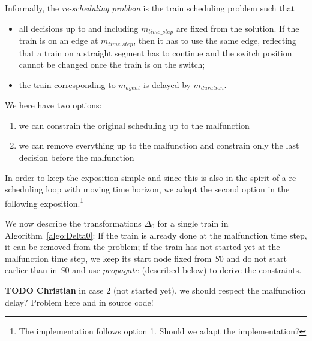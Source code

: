 \documentclass{article}
\begin{document}
Informally, the \emph{re-scheduling problem} is the train scheduling problem such that
\begin{itemize}
    \item all decisions up to and including $m_{time\_step}$ are fixed from the solution. If the train is on an edge at $m_{time\_step}$, then it has to use the same edge, reflecting that a train on a straight segment has to continue and the switch position cannot be changed once the train is on the switch;
    \item the train corresponding to $m_{agent}$ is delayed by $m_{duration}$.
\end{itemize}
We here have two options:
\begin{enumerate}
    \item we can constrain the original scheduling up to the malfunction
    \item we can remove everything up to the malfunction and constrain only the last decision before the malfunction
\end{enumerate}
In order to keep the exposition simple and since this is also in the spirit of a re-scheduling loop with moving time horizon, we adopt the second option in the following exposition.\footnote{The implementation follows option 1. Should we adapt the implementation?}



We now describe the transformations $\Delta_0$ for a single train in Algorithm~\ref{algo:Delta0}:
If the train is already done at the malfunction time step, it can be removed from the problem;
if the train has not started yet at the malfunction time step, we keep its start node fixed from $S0$ and do not start earlier than in $S0$ and use $propagate$ (described below) to derive the constraints.




\begin{mdframed}
{\bf TODO Christian} in case 2 (not started yet), we should respect the malfunction delay? Problem here and in source code!
\end{mdframed}
\end{document}
